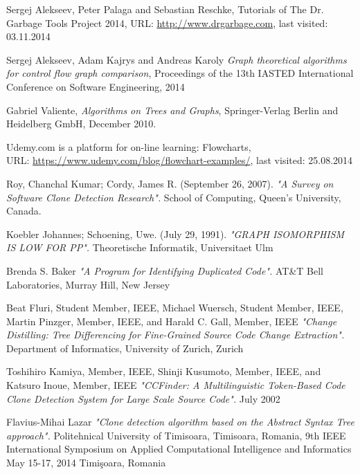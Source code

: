 \documentclass{report}
\begin{document}
\begin{thebibliography}{100} %

  Sergej Alekseev, Peter Palaga and Sebastian Reschke, Tutorials of The Dr. Garbage Tools Project 2014,  URL: \url{http://www.drgarbage.com}, last visited: 03.11.2014

 Sergej Alekseev, Adam Kajrys and Andreas Karoly \emph{ Graph theoretical algorithms for control flow graph comparison}, Proceedings of the 13th IASTED International Conference on Software Engineering, 2014
 
 Gabriel Valiente, \emph{Algorithms on Trees and Graphs}, Springer-Verlag Berlin and Heidelberg GmbH,  December 2010.

 Udemy.com is a platform for on-line learning: Flowcharts,\\ URL: \url{https://www.udemy.com/blog/flowchart-examples/}, last visited: 25.08.2014
 
 Roy, Chanchal Kumar; Cordy, James R. (September 26, 2007). \emph{"A Survey on Software Clone Detection Research".} School of Computing, Queen's University, Canada.

 Koebler Johannes; Schoening, Uwe. (July 29, 1991). \emph{"GRAPH ISOMORPHISM IS LOW FOR PP".} Theoretische Informatik, Universitaet Ulm

 Brenda S. Baker \emph{"A Program for Identifying Duplicated Code".} AT\&T Bell Laboratories, Murray Hill, New Jersey

 Beat Fluri, Student Member, IEEE, Michael Wuersch, Student Member, IEEE, Martin Pinzger, Member, IEEE, and Harald C. Gall, Member, IEEE \emph{"Change Distilling: Tree Differencing for Fine-Grained Source Code Change Extraction".} Department of Informatics, University of Zurich, Zurich 

 Toshihiro Kamiya, Member, IEEE, Shinji Kusumoto, Member, IEEE, and Katsuro Inoue, Member, IEEE \emph{"CCFinder: A Multilinguistic Token-Based Code Clone Detection System for Large Scale Source Code".} July 2002

 Flavius-Mihai Lazar \emph{"Clone detection algorithm based on the Abstract Syntax Tree approach".} Politehnical University of Timisoara, Timisoara, Romania, 9th IEEE International Symposium on Applied Computational Intelligence and Informatics May 15-17, 2014 Timişoara, Romania


\end{thebibliography}
\end{document}
